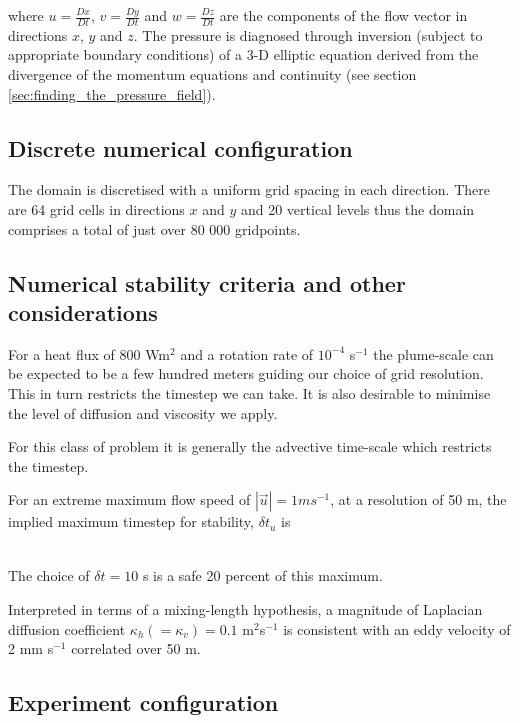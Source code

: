 \noindent where $u=\frac{Dx}{Dt}$, $v=\frac{Dy}{Dt}$  and 
$w=\frac{Dz}{Dt}$ are the components of the
flow vector in directions $x$, $y$ and $z$. 
The pressure is diagnosed through inversion (subject to appropriate boundary
conditions) of a 3-D elliptic equation derived from the divergence of the momentum 
equations and continuity (see section \ref{sec:finding_the_pressure_field}).
\\

\subsection{Discrete numerical configuration}
\label{www:tutorials}

The domain is discretised with a uniform grid spacing in each direction. There are 64
grid cells in directions $x$ and $y$ and 20 vertical levels thus the domain
comprises a total of just over 80 000 gridpoints.

\subsection{Numerical stability criteria and other considerations}
\label{www:tutorials}

For a heat flux of 800 Wm$^2$ and a rotation rate of $10^{-4}$ s$^{-1}$ the
plume-scale can be expected to be a few hundred meters guiding our choice of grid
resolution. This in turn restricts the timestep we can take. It is also desirable to 
minimise the level of diffusion and viscosity we apply.

For this class of problem it is generally the advective time-scale which restricts 
the timestep. 

For an extreme maximum flow speed of $ | \vec{u} | = 1 ms^{-1}$, at a resolution of
50 m, the implied maximum timestep for stability, $\delta t_u$ is 

\begin{eqnarray}
\label{EQ:eg-bconv-advectiveCFLcondition}
\end{eqnarray}

The choice of $\delta t = 10$ s is a safe 20 percent of this maximum.
 
Interpreted in terms of a mixing-length hypothesis, a magnitude of Laplacian
diffusion coefficient $\kappa_h (=
\kappa_v) = 0.1$ m$^2$s$^{-1}$ is consistent with an eddy velocity of 2 mm s$^{-1}$
correlated over 50 m.  

\subsection{Experiment configuration}
\label{www:tutorials}

